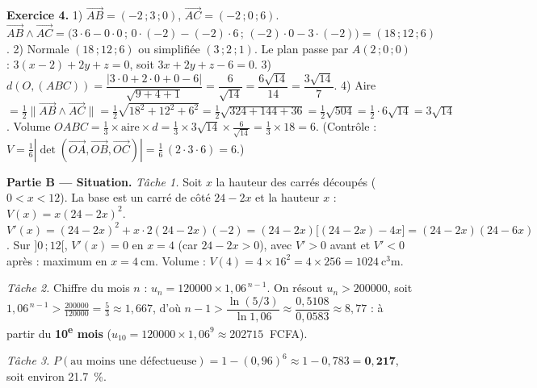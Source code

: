 \noindent\textbf{Exercice 4.}
1) $\vec{AB}=(-2\,;3\,;0)$, $\vec{AC}=(-2\,;0\,;6)$.
$\vec{AB}\wedge\vec{AC}=\big(3\cdot6-0\cdot0\,;\,0\cdot(-2)-(-2)\cdot6\,;\,(-2)\cdot0-3\cdot(-2)\big)=(18\,;12\,;6)$.
2) Normale $(18\,;12\,;6)$ ou simplifiée $(3\,;2\,;1)$. Le plan passe par $A(2\,;0\,;0)$ :
$3(x-2)+2y+z=0$, soit $3x+2y+z-6=0$.
3) $d(O,(ABC))=\dfrac{|3\cdot0+2\cdot0+0-6|}{\sqrt{9+4+1}}=\dfrac{6}{\sqrt{14}}=\dfrac{6\sqrt{14}}{14}=\dfrac{3\sqrt{14}}{7}$.
4) Aire $=\frac12\|\vec{AB}\wedge\vec{AC}\|=\frac12\sqrt{18^2+12^2+6^2}=\frac12\sqrt{324+144+36}=\frac12\sqrt{504}=\frac12\cdot6\sqrt{14}=3\sqrt{14}$.
Volume $OABC=\frac13\times\text{aire}\times d=\frac13\times3\sqrt{14}\times\frac{6}{\sqrt{14}}=\frac13\times18=6$.
(Contrôle : $V=\frac16|\det(\vec{OA},\vec{OB},\vec{OC})|=\frac16\,(2\cdot3\cdot6)=6$.)

\smallskip
\noindent\textbf{Partie B — Situation.}
\emph{Tâche 1.} Soit $x$ la hauteur des carrés découpés ($0<x<12$). La base est un carré de côté
$24-2x$ et la hauteur $x$ : $V(x)=x(24-2x)^2$. $V'(x)=(24-2x)^2+x\cdot2(24-2x)(-2)
=(24-2x)\big[(24-2x)-4x\big]=(24-2x)(24-6x)$.
Sur $]0\,;12[$, $V'(x)=0$ en $x=4$ (car $24-2x>0$), avec $V'>0$ avant et $V'<0$ après : maximum en
$x=\SI{4}{\centi\metre}$. Volume : $V(4)=4\times16^2=4\times256=\SI{1024}{\cubic\centi\metre}$.

\emph{Tâche 2.} Chiffre du mois $n$ : $u_n=120000\times1{,}06^{\,n-1}$. On résout $u_n>200000$,
soit $1{,}06^{\,n-1}>\frac{200000}{120000}=\frac53\approx1{,}667$, d'où
$n-1>\dfrac{\ln(5/3)}{\ln1{,}06}\approx\dfrac{0{,}5108}{0{,}0583}\approx8{,}77$ : à partir du
\textbf{10\textsuperscript{e} mois} ($u_{10}=120000\times1{,}06^9\approx\SI{202715}{}$ FCFA).

\emph{Tâche 3.} $P(\text{au moins une défectueuse})=1-(0{,}96)^6\approx1-0{,}783=\mathbf{0{,}217}$, soit environ \SI{21,7}{\percent}.
